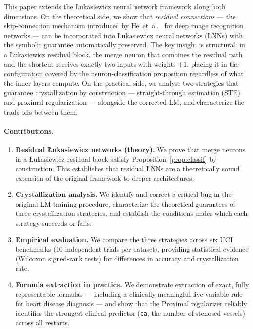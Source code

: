 \documentclass[12pt,a4paper]{article}
\newcommand{\LNN}{\L{}NN}
\begin{document}
This paper extends the \L{}ukasiewicz neural network framework along both
dimensions.
On the theoretical side, we show that \emph{residual connections}
--- the skip-connection mechanism introduced by He~et~al.~\cite{he2016} for
deep image recognition networks --- can be incorporated into \L{}ukasiewicz
neural networks (\LNN{}s) with the symbolic guarantee automatically preserved.
The key insight is structural: in a \L{}ukasiewicz residual block, the merge
neuron that combines the residual path and the shortcut receives exactly two
inputs with weights $+1$, placing it in the configuration covered by the
neuron-classification proposition regardless of what the inner layers compute.
On the practical side, we analyse two strategies that guarantee crystallization
by construction --- straight-through estimation (STE)~\cite{bengio2013} and
proximal regularization --- alongside the corrected LM, and characterize the
trade-offs between them.

\paragraph{Contributions.}
\begin{enumerate}
  \item \textbf{Residual \L{}ukasiewicz networks (theory).}
    We prove that merge neurons in a \L{}ukasiewicz residual block satisfy
    Proposition~\ref{prop:classif} by construction.
    This establishes that residual \LNN{}s are a theoretically sound extension
    of the original framework to deeper architectures.
  \item \textbf{Crystallization analysis.}
    We identify and correct a critical bug in the original LM training procedure,
    characterize the theoretical guarantees of three crystallization strategies,
    and establish the conditions under which each strategy succeeds or fails.
  \item \textbf{Empirical evaluation.}
    We compare the three strategies across six UCI benchmarks (10 independent
    trials per dataset), providing statistical evidence (Wilcoxon signed-rank
    tests) for differences in accuracy and crystallization rate.
  \item \textbf{Formula extraction in practice.}
    We demonstrate extraction of exact, fully representable formulas ---
    including a clinically meaningful five-variable rule for heart disease
    diagnosis --- and show that the Proximal regularizer reliably identifies
    the strongest clinical predictor (\texttt{ca}, the number of stenosed
    vessels) across all restarts.
\end{enumerate}
\end{document}
